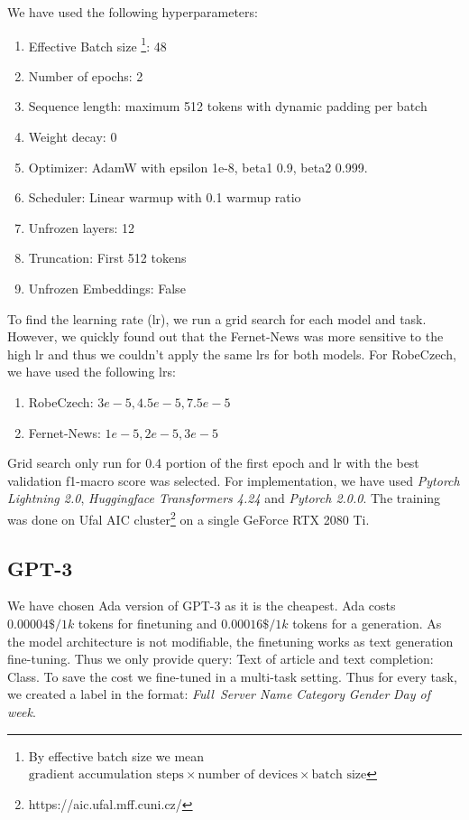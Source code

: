 We have used the following hyperparameters:
\begin{enumerate}
    \item Effective Batch size
    \footnote{By effective batch size we mean 
    $\text{gradient accumulation steps} \times \text{number of devices}
    \times \text{batch size}$
    }: 48
    \item Number of epochs: 2
    \item Sequence length: maximum 512 tokens with dynamic padding per batch
    \item Weight decay: 0
    \item Optimizer: AdamW with epsilon 1e-8, beta1 0.9, beta2 0.999.
    \item Scheduler: Linear warmup with 0.1 warmup ratio
    \item Unfrozen layers: 12
    \item Truncation: First 512 tokens
    \item Unfrozen Embeddings: False
\end{enumerate}
To find the learning rate (lr), we run a grid search for each model and task.
However, we quickly found out that the Fernet-News was more sensitive to the high lr and thus we couldn't apply the same lrs for both models.
For RobeCzech, we have used the following lrs:
\begin{enumerate}
    \item RobeCzech: $3e-5, 4.5e-5, 7.5e-5$
    \item Fernet-News: $1e-5, 2e-5, 3e-5$
\end{enumerate}

Grid search only run for 0.4 portion of the first epoch and lr with the best validation f1-macro score was selected.
For implementation, we have used \textit{Pytorch Lightning 2.0}, \textit{Huggingface Transformers 4.24} and \textit{Pytorch 2.0.0}.
The training was done on Ufal AIC cluster\footnote{https://aic.ufal.mff.cuni.cz/} on a single GeForce RTX 2080 Ti.

\subsection{GPT-3}
\label{sec:gpt-3}
We have chosen Ada version of GPT-3 as it is the cheapest.
Ada costs $0.00004\$/1k$ tokens for finetuning and $0.00016\$/1k$ tokens for a generation.
As the model architecture is not modifiable, the finetuning works
as text generation fine-tuning.
Thus we only provide query: Text of article and text completion: Class.
To save the cost we fine-tuned in a multi-task setting.
Thus for every task, we created a label in the format: \textit{Full\ Server Name} \textit{Category} \textit{Gender} \textit{Day of week}.

